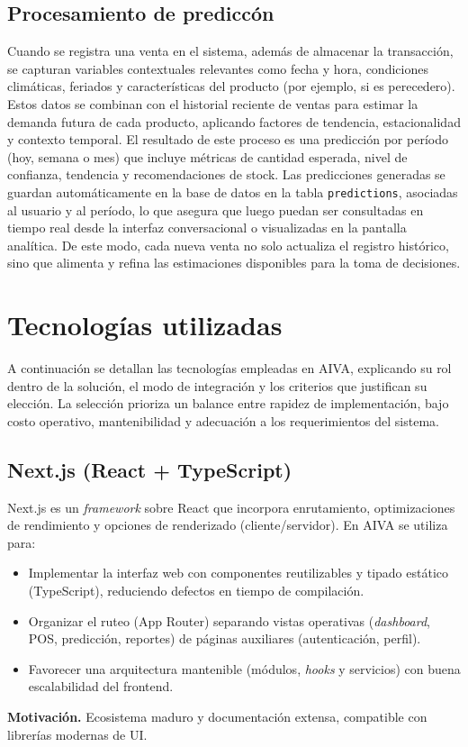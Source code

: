 \subsection{Procesamiento de prediccón}
Cuando se registra una venta en el sistema, además de almacenar la transacción, se capturan variables contextuales relevantes como fecha y hora, condiciones climáticas, feriados y características del producto (por ejemplo, si es perecedero). Estos datos se combinan con el historial reciente de ventas para estimar la demanda futura de cada producto, aplicando factores de tendencia, estacionalidad y contexto temporal. El resultado de este proceso es una predicción por período (hoy, semana o mes) que incluye métricas de cantidad esperada, nivel de confianza, tendencia y recomendaciones de stock. Las predicciones generadas se guardan automáticamente en la base de datos en la tabla \texttt{predictions}, asociadas al usuario y al período, lo que asegura que luego puedan ser consultadas en tiempo real desde la interfaz conversacional o visualizadas en la pantalla analítica. De este modo, cada nueva venta no solo actualiza el registro histórico, sino que alimenta y refina las estimaciones disponibles para la toma de decisiones.


\section{Tecnologías utilizadas}\label{sec:tecnologias}
A continuación se detallan las tecnologías empleadas en AIVA, explicando su rol dentro de la solución, el modo de integración y los criterios que justifican su elección. La selección prioriza un balance entre rapidez de implementación, bajo costo operativo, mantenibilidad y adecuación a los requerimientos del sistema.

\subsection{Next.js (React + TypeScript)}
Next.js es un \textit{framework} sobre React que incorpora enrutamiento, optimizaciones de rendimiento y opciones de renderizado (cliente/servidor). En AIVA se utiliza para:
\begin{itemize}
    \item Implementar la interfaz web con componentes reutilizables y tipado estático (TypeScript), reduciendo defectos en tiempo de compilación.
    \item Organizar el ruteo (App Router) separando vistas operativas (\textit{dashboard}, POS, predicción, reportes) de páginas auxiliares (autenticación, perfil).
    \item Favorecer una arquitectura mantenible (módulos, \textit{hooks} y servicios) con buena escalabilidad del frontend.
\end{itemize}
\noindent\textbf{Motivación.} Ecosistema maduro y documentación extensa, compatible con librerías modernas de UI.

